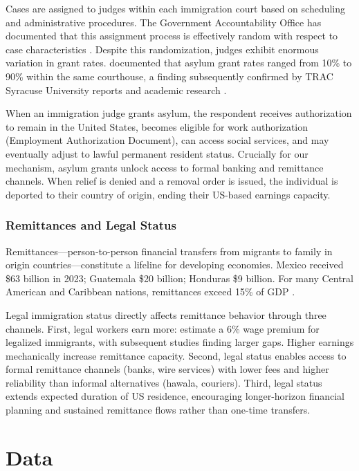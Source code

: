 \documentclass[12pt]{article}
\begin{document}
Cases are assigned to judges within each immigration court based on scheduling and administrative procedures. The Government Accountability Office has documented that this assignment process is effectively random with respect to case characteristics \citep{GAO2008, GAO2017}. Despite this randomization, judges exhibit enormous variation in grant rates. \citet{Ramji-Nogales2007} documented that asylum grant rates ranged from 10\% to 90\% within the same courthouse, a finding subsequently confirmed by TRAC Syracuse University reports and academic research \citep{Miller2015, Hausman2016}.

When an immigration judge grants asylum, the respondent receives authorization to remain in the United States, becomes eligible for work authorization (Employment Authorization Document), can access social services, and may eventually adjust to lawful permanent resident status. Crucially for our mechanism, asylum grants unlock access to formal banking and remittance channels. When relief is denied and a removal order is issued, the individual is deported to their country of origin, ending their US-based earnings capacity.

\subsubsection*{Remittances and Legal Status} Remittances---person-to-person financial transfers from migrants to family in origin countries---constitute a lifeline for developing economies. Mexico received \$63 billion in 2023; Guatemala \$20 billion; Honduras \$9 billion. For many Central American and Caribbean nations, remittances exceed 15\% of GDP \citep{WorldBank2023}.

Legal immigration status directly affects remittance behavior through three channels. First, legal workers earn more: \citet{Kossoudji2002} estimate a 6\% wage premium for legalized immigrants, with subsequent studies finding larger gaps. Higher earnings mechanically increase remittance capacity. Second, legal status enables access to formal remittance channels (banks, wire services) with lower fees and higher reliability than informal alternatives (hawala, couriers). Third, legal status extends expected duration of US residence, encouraging longer-horizon financial planning and sustained remittance flows rather than one-time transfers.

\section{Data}
\end{document}
